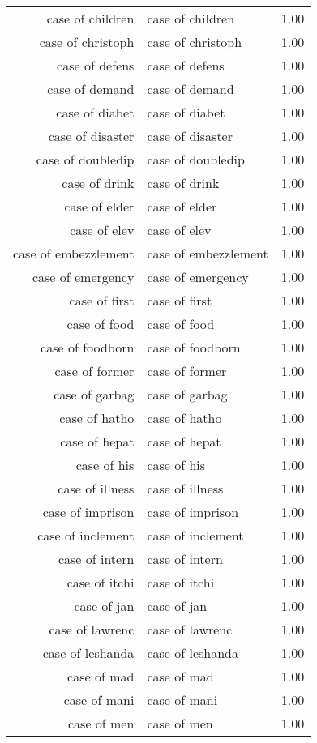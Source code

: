 \begin{table}[ht]
\begin{tabular}{rlr}
  case of children & case of children & 1.00 \\ 
  case of christoph & case of christoph & 1.00 \\ 
  case of defens & case of defens & 1.00 \\ 
  case of demand & case of demand & 1.00 \\ 
  case of diabet & case of diabet & 1.00 \\ 
  case of disaster & case of disaster & 1.00 \\ 
  case of doubledip & case of doubledip & 1.00 \\ 
  case of drink & case of drink & 1.00 \\ 
  case of elder & case of elder & 1.00 \\ 
  case of elev & case of elev & 1.00 \\ 
  case of embezzlement & case of embezzlement & 1.00 \\ 
  case of emergency & case of emergency & 1.00 \\ 
  case of first & case of first & 1.00 \\ 
  case of food & case of food & 1.00 \\ 
  case of foodborn & case of foodborn & 1.00 \\ 
  case of former & case of former & 1.00 \\ 
  case of garbag & case of garbag & 1.00 \\ 
  case of hatho & case of hatho & 1.00 \\ 
  case of hepat & case of hepat & 1.00 \\ 
  case of his & case of his & 1.00 \\ 
  case of illness & case of illness & 1.00 \\ 
  case of imprison & case of imprison & 1.00 \\ 
  case of inclement & case of inclement & 1.00 \\ 
  case of intern & case of intern & 1.00 \\ 
  case of itchi & case of itchi & 1.00 \\ 
  case of jan & case of jan & 1.00 \\ 
  case of lawrenc & case of lawrenc & 1.00 \\ 
  case of leshanda & case of leshanda & 1.00 \\ 
  case of mad & case of mad & 1.00 \\ 
  case of mani & case of mani & 1.00 \\ 
  case of men & case of men & 1.00 \\ 

\end{tabular}
\end{table}
